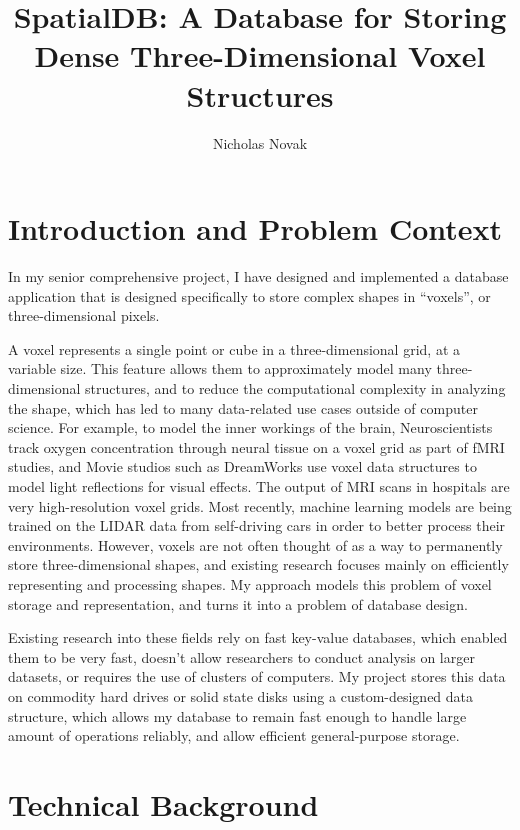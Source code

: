 \documentclass[10pt,twocolumn]{article}
\title{SpatialDB: A Database for Storing Dense Three-Dimensional Voxel Structures}
\author{Nicholas Novak}
\affiliation{Occidental College}
\begin{document}
\maketitle

\section{Introduction and Problem Context}

In my senior comprehensive project, I have designed and implemented a database
application that is designed specifically to store complex shapes in ``voxels'',
or three-dimensional pixels.

A voxel\cite{enwiki:1186283262} represents a single point or cube in a
three-dimensional grid, at a variable size. This feature allows them to
approximately model many three-dimensional structures, and to reduce the
computational complexity in analyzing the shape, which has led to many
data-related use cases outside of computer science. For example, to model the
inner workings of the brain, Neuroscientists track oxygen concentration through
neural tissue on a voxel grid as part of fMRI studies\cite{norman2006beyond},
and Movie studios such as DreamWorks use voxel data structures to model light
reflections for visual effects\cite{museth2013vdb}. The output of MRI scans in
hospitals are very high-resolution voxel grids. Most recently, machine learning
models are being trained on the LIDAR data from self-driving
cars\cite{li2020deep} in order to better process their environments. However,
voxels are not often thought of as a way to permanently store three-dimensional shapes, and
existing research focuses mainly on efficiently representing and processing
shapes. My approach models this problem of voxel storage and representation, and
turns it into a problem of database design.

Existing research into these fields rely on fast key-value databases, which
enabled them to be very fast, doesn't allow researchers to conduct analysis on
larger datasets, or requires the use of clusters of computers. My project stores
this data on commodity hard drives or solid state disks using a custom-designed
data structure, which allows my database to remain fast enough to handle large
amount of operations reliably, and allow efficient general-purpose storage.

\section{Technical Background}
\end{document}
